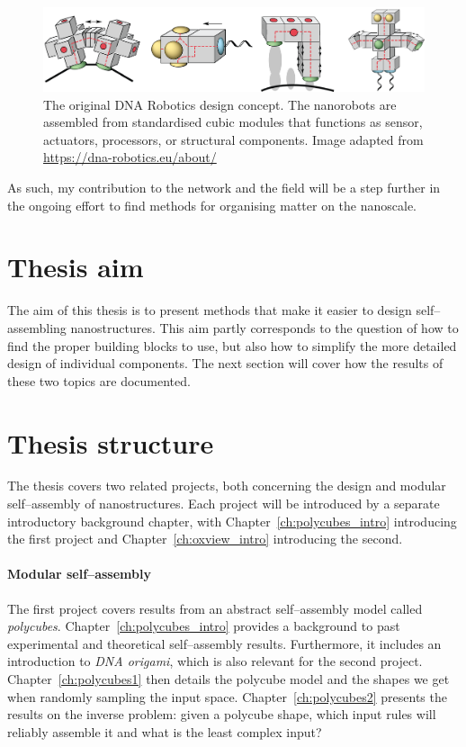 \begin{figure}
    \centering\includegraphics[width=\textwidth]{figures/dnaRoboticsHeader.png} 
    \caption{The original DNA Robotics design concept. The nanorobots are assembled from standardised cubic modules that functions as sensor, actuators, processors, or structural components. Image adapted from \url{https://dna-robotics.eu/about/}}
    \label{fig:dnaRoboticsHeader}
\end{figure}

As such, my contribution to the network and the field will be a step further in the ongoing effort to find methods for organising matter on the nanoscale.

\section{Thesis aim}
The aim of this thesis is to present methods that make it easier to design self--assembling nanostructures. This aim partly corresponds to the question of how to find the proper building blocks to use, but also how to simplify the more detailed design of individual components. The next section will cover how the results of these two topics are documented.

\section{Thesis structure}
The thesis covers two related projects, both concerning the design and modular self--assembly of nanostructures. Each project will be introduced by a separate introductory background chapter, with Chapter~\ref{ch:polycubes_intro} introducing the first project and Chapter~\ref{ch:oxview_intro} introducing the second.

\paragraph{Modular self--assembly}
The first project covers results from an abstract self--assembly model called \emph{polycubes}. Chapter~\ref{ch:polycubes_intro} provides a background to past experimental and theoretical self--assembly results. Furthermore, it includes an introduction to \emph{DNA origami}, which is also relevant for the second project. Chapter~\ref{ch:polycubes1} then details the polycube model and the shapes we get when randomly sampling the input space. Chapter~\ref{ch:polycubes2} presents the results on the inverse problem: given a polycube shape, which input rules will reliably assemble it and what is the least complex input?

